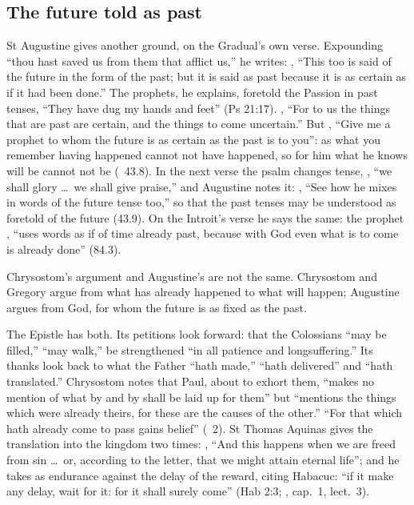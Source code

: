 \subsection{The future told as past}
\label{sec:words-tenses}

St Augustine gives another ground, on the Gradual's own verse. Expounding
``thou hast saved us from them that afflict us,'' he writes: , ``This too is said of the future in the
form of the past; but it is said as past because it is as certain as if it had
been done.'' The prophets, he explains, foretold the Passion in past tenses,
``They have dug my hands and feet'' (Ps 21:17). , ``For to us the things
that are past are certain, and the things to come uncertain.'' But , ``Give me a
prophet to whom the future is as certain as the past is to you'': as what you
remember having happened cannot not have happened, so for him what he knows
will be cannot not be (~43.8). In the next verse
the psalm changes tense, , ``we shall
glory \dots\ we shall give praise,'' and Augustine notes it: , ``See how he mixes in words
of the future tense too,'' so that the past tenses may be understood as
foretold of the future (43.9). On the Introit's verse he says the same: the
prophet , ``uses words as if of time already
past, because with God even what is to come is already done'' (84.3).

Chrysostom's argument and Augustine's are not the same. Chrysostom and
Gregory argue from what has already happened to what will happen; Augustine
argues from God, for whom the future is as fixed as the past.

The Epistle has both. Its petitions look forward: that the Colossians ``may be
filled,'' ``may walk,'' be strengthened ``in all patience and longsuffering.''
Its thanks look back to what the Father ``hath made,'' ``hath delivered'' and
``hath translated.'' Chrysostom notes that Paul, about to exhort them, ``makes
no mention of what by and by shall be laid up for them'' but ``mentions the
things which were already theirs, for these are the causes of the other.''
``For that which hath already come to pass gains belief'' (~2). St Thomas Aquinas gives the translation into the kingdom two times:
, ``And this happens when we are freed from sin
\dots\ or, according to the letter, that we might attain eternal life''; and he
takes  as endurance against the delay of the reward,
citing Habacuc: ``if it make any delay, wait for it: for it shall surely
come'' (Hab 2:3; , cap.~1, lect.~3).


